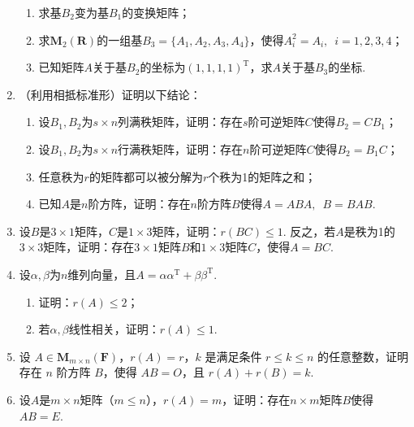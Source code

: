 \begin{enumerate}
\begin{enumerate}
              \item 求基$B_2$变为基$B_1$的变换矩阵；

              \item 求$\mathbf{M}_2(\mathbf{R})$的一组基$B_3=\{A_1,A_2,A_3,A_4\}$，使得$A_i^2=A_i,\enspace i=1,2,3,4$；

              \item 已知矩阵$A$关于基$B_2$的坐标为$(1,1,1,1)^\mathrm{T}$，求$A$关于基$B_3$的坐标.
          \end{enumerate}

    \item （利用相抵标准形）证明以下结论：
          \begin{enumerate}
              \item 设$B_1,B_2$为$s \times n$列满秩矩阵，证明：存在$s$阶可逆矩阵$C$使得$B_2=CB_1$；

              \item 设$B_1,B_2$为$s \times n$行满秩矩阵，证明：存在$n$阶可逆矩阵$C$使得$B_2=B_1C$；

              \item 任意秩为$r$的矩阵都可以被分解为$r$个秩为1的矩阵之和；

              \item 已知$A$是$n$阶方阵，证明：存在$n$阶方阵$B$使得$A=ABA,\enspace B=BAB$.
          \end{enumerate}

    \item 设$B$是$3 \times 1$矩阵，$C$是$1 \times 3$矩阵，证明：$r(BC) \leqslant 1$. 反之，若$A$是秩为1的$3 \times 3$矩阵，证明：存在$3 \times 1$矩阵$B$和$1 \times 3$矩阵$C$，使得$A = BC$.

    \item 设$\alpha,\beta$为$n$维列向量，且$A=\alpha\alpha^\mathrm{T}+\beta\beta^\mathrm{T}$.
          \begin{enumerate}
              \item 证明：$r(A) \leqslant 2$；

              \item 若$\alpha,\beta$线性相关，证明：$r(A) \leqslant 1$.
          \end{enumerate}

    \item 设 $A \in \mathbf{M}_{m \times n}(\mathbf{F})$，$r(A)=r$，$k$ 是满足条件 $r \leqslant k \leqslant n$ 的任意整数，证明存在 $n$ 阶方阵 $B$，使得 $AB=O$，且 $r(A)+r(B)=k$.

    \item 设$A$是$m \times n$矩阵（$m \leqslant n$），$r(A)=m$，证明：存在$n \times m$矩阵$B$使得$AB=E$.


\end{enumerate}
